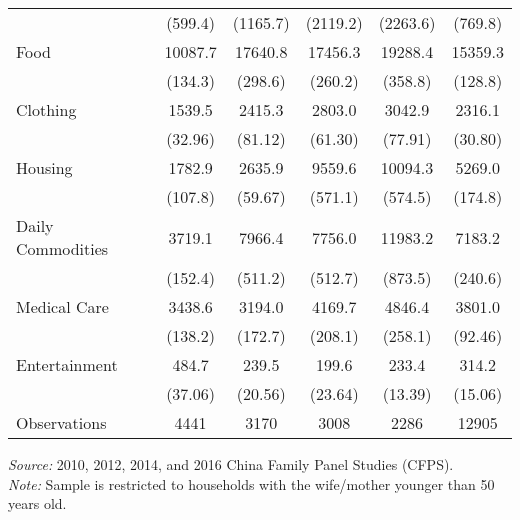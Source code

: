 \documentclass[12pt]{extarticle}
\begin{document}
\begin{table}
\begin{threeparttable}
\begin{tabular}{l*{5}{c}}
                    &     (599.4)&    (1165.7)&    (2119.2)&    (2263.6)&     (769.8)\\                    
[1em]
Food                &     10087.7&     17640.8&     17456.3&     19288.4&     15359.3\\
                    &     (134.3)&     (298.6)&     (260.2)&     (358.8)&     (128.8)\\
[1em]
Clothing            &      1539.5&      2415.3&      2803.0&      3042.9&      2316.1\\
                    &     (32.96)&     (81.12)&     (61.30)&     (77.91)&     (30.80)\\
[1em]
Housing             &      1782.9&      2635.9&      9559.6&     10094.3&      5269.0\\
                    &     (107.8)&     (59.67)&     (571.1)&     (574.5)&     (174.8)\\
[1em]
Daily Commodities   &      3719.1&      7966.4&      7756.0&     11983.2&      7183.2\\
                    &     (152.4)&     (511.2)&     (512.7)&     (873.5)&     (240.6)\\
[1em]
Medical Care        &      3438.6&      3194.0&      4169.7&      4846.4&      3801.0\\
                    &     (138.2)&     (172.7)&     (208.1)&     (258.1)&     (92.46)\\
[1em]
Entertainment       &       484.7&       239.5&       199.6&       233.4&       314.2\\
                    &     (37.06)&     (20.56)&     (23.64)&     (13.39)&     (15.06)\\
\hline
Observations        &        4441&        3170&        3008&        2286&      12905\\
\hline\hline
\end{tabular}
\begin{tablenotes}
\footnotesize \textit{Source:} 2010, 2012, 2014, and 2016 China Family Panel Studies (CFPS). \\
\textit{Note:} Sample is restricted to households with the wife/mother younger than 50 years old.
\end{tablenotes}
\end{threeparttable}
\end{table}
\end{document}
